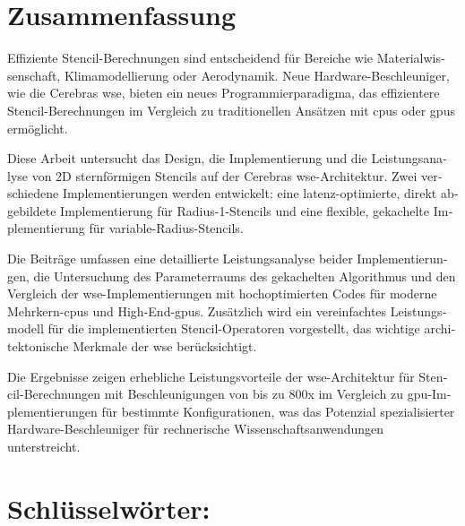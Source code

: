 \begin{otherlanguage}{ngerman}
\section*{Zusammenfassung}
Effiziente Stencil-Berechnungen sind entscheidend für Bereiche wie Materialwissenschaft, Klimamodellierung oder Aerodynamik. Neue Hardware-Beschleuniger, wie die Cerebras \ac{wse}, bieten ein neues Programmierparadigma, das effizientere Stencil-Berechnungen im Vergleich zu traditionellen Ansätzen mit \acp{cpu} oder \acp{gpu} ermöglicht.

Diese Arbeit untersucht das Design, die Implementierung und die Leistungsanalyse von 2D sternförmigen Stencils auf der Cerebras \ac{wse}-Architektur. Zwei verschiedene Implementierungen werden entwickelt: eine latenz-optimierte, direkt abgebildete Implementierung für Radius-1-Stencils und eine flexible, gekachelte Implementierung für variable-Radius-Stencils.

Die Beiträge umfassen eine detaillierte Leistungsanalyse beider Implementierungen, die Untersuchung des Parameterraums des gekachelten Algorithmus und den Vergleich der \ac{wse}-Implementierungen mit hochoptimierten Codes für moderne Mehrkern-\acp{cpu} und High-End-\acp{gpu}. Zusätzlich wird ein vereinfachtes Leistungsmodell für die implementierten Stencil-Operatoren vorgestellt, das wichtige architektonische Merkmale der \ac{wse} berücksichtigt.

Die Ergebnisse zeigen erhebliche Leistungsvorteile der \ac{wse}-Architektur für Stencil-Berechnungen mit Beschleunigungen von bis zu 800x im Vergleich zu \ac{gpu}-Implementierungen für bestimmte Konfigurationen, was das Potenzial spezialisierter Hardware-Beschleuniger für rechnerische Wissenschaftsanwendungen unterstreicht.

\section*{Schlüsselwörter:} \itshape \germankeywords
\end{otherlanguage}

